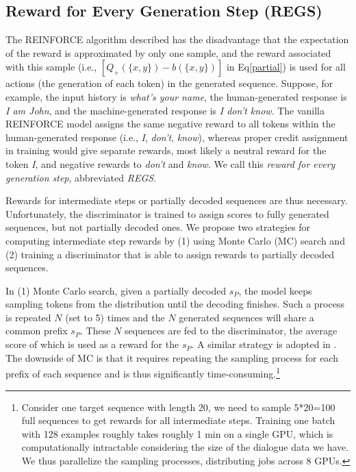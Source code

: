 \documentclass[11pt]{article}
\begin{document}
\subsection{Reward for Every Generation Step (REGS)}
The  REINFORCE algorithm
described has the disadvantage that the expectation of the reward is approximated by only one sample, and the reward associated with this sample 
(i.e.,  $[Q_+(\{x,y\})-b(\{x,y\})]$ in Eq\eqref{partial})
is used for all actions (the generation of each token) in the generated sequence. 
Suppose, for example, the input history is {\it what's your name}, the human-generated response is {\it I am John}, and the machine-generated response is {\it I don't know}. 
The vanilla REINFORCE model assigns the same negative reward to all tokens within the human-generated response (i.e., {\it I}, {\it don't}, {\it know}), whereas 
proper credit assignment in training would  give separate rewards, most likely a neutral reward for the token {\it I}, and negative rewards to {\it don't} and {\it know}. 
We call this {\it reward for every generation step}, abbreviated {\it REGS}.

Rewards for intermediate steps or partially decoded sequences are thus necessary. Unfortunately, the discriminator is trained to assign scores to fully generated sequences, but not partially decoded ones. 
We propose two strategies for computing intermediate step rewards by (1) using Monte Carlo (MC) search and (2) training a discriminator that is able to assign rewards to partially decoded sequences.

In (1) Monte Carlo search, given a partially decoded $s_P$, the model 
keeps sampling tokens from the distribution
 until the decoding finishes. Such a process is repeated $N$ (set to 5) times and the $N$ generated   sequences will share  a common prefix $s_P$.
These $N$ sequences 
are fed to the discriminator, the average score of which is used as a reward for the $s_P$. A similar strategy is adopted in . 
The downside of MC is that 
it requires repeating the sampling process for each prefix of each sequence  and is thus significantly time-consuming.\footnote{Consider one target sequence with length 20, we need to sample 5*20=100 full sequences to get rewards for all intermediate steps. Training one batch with 128 examples roughly takes roughly 1 min on a single GPU, which is computationally intractable considering the size of the dialogue data we have. We thus parallelize the sampling processes, distributing jobs across 8 GPUs. }
\end{document}
